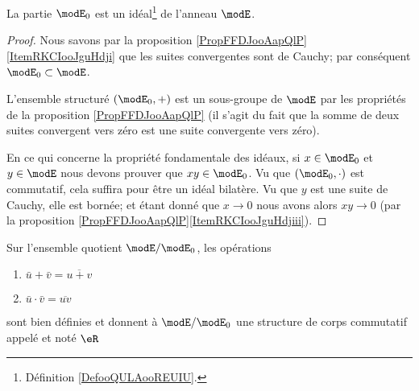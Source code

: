 \begin{proposition}
    La partie \( \modE_0\) est un idéal\footnote{Définition \ref{DefooQULAooREUIU}.} de l'anneau \( \modE\).
\end{proposition}

\begin{proof}
    Nous savons par la proposition \ref{PropFFDJooAapQlP}\ref{ItemRKCIooJguHdji} que les suites convergentes sont de Cauchy; par conséquent \( \modE_0\subset\modE\).

    L'ensemble structuré \( (\modE_0,+)\) est un sous-groupe de \( \modE\) par les propriétés de la proposition \ref{PropFFDJooAapQlP} (il s'agit du fait que la somme de deux suites convergent vers zéro est une suite convergente vers zéro).

    En ce qui concerne la propriété fondamentale des idéaux, si \( x\in\modE_0\) et \( y\in\modE\) nous devons prouver que \( xy\in \modE_0\). Vu que \( (\modE_0,\cdot)\) est commutatif, cela suffira pour être un idéal bilatère. Vu que \( y\) est une suite de Cauchy, elle est bornée; et étant donné que \( x\to 0\) nous avons alors \( xy\to 0\) (par la proposition \ref{PropFFDJooAapQlP}\ref{ItemRKCIooJguHdjiii}).
\end{proof}

\begin{theoremDef}       \label{DefooFKYKooOngSCB}
    Sur l'ensemble quotient \( \modE/\modE_0\), les opérations
    \begin{enumerate}
        \item
            \( \bar u+\bar v=\overline{ u+v }\)
        \item
            \( \bar u\cdot \bar v=\overline{ uv }\)
    \end{enumerate}
    sont bien définies et donnent à \( \modE/\modE_0\) une structure de corps commutatif appelé  et noté \( \eR\)
\end{theoremDef}


